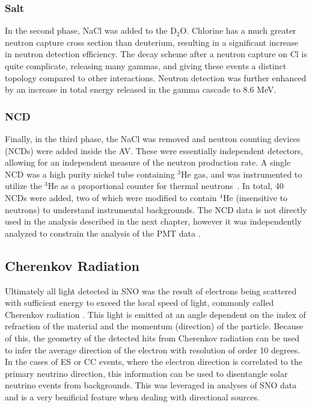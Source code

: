 \subsubsection{Salt}

In the second phase, NaCl was added to the D$_2$O.
Chlorine has a much greater neutron capture cross section than deuterium, resulting in a significant increase in neutron detection efficiency.
The decay scheme after a neutron capture on Cl is quite complicate, releasing many gammas, and giving these events a distinct topology compared to other interactions.
Neutron detection was further enhanced by an increase in total energy released in the gamma cascade to 8.6 MeV.

\subsubsection{NCD}

Finally, in the third phase, the NaCl was removed and neutron counting devices (NCDs) were added inside the AV.
These were essentially independent detectors, allowing for an independent measure of the neutron production rate.
A single NCD was a high purity nickel tube containing $^3$He gas, and was instrumented to utilize the $^3$He as a proportional counter for thermal neutrons~\cite{ncd}.
In total, 40 NCDs were added, two of which were modified to contain $^4$He (insensitive to neutrons) to understand instrumental backgrounds.
The NCD data is not directly used in the analysis described in the next chapter, however it was independently analyzed to constrain the analysis of the PMT data \cite{sno_ncd_psa,3phase}.

\subsection{Cherenkov Radiation}

Ultimately all light detected in SNO was the result of electrons being scattered with sufficient energy to exceed the local speed of light, commonly called Cherenkov radiation \cite{cherenkov}.
This light is emitted at an angle dependent on the index of refraction of the material and the momentum (direction) of the particle. 
Because of this, the geometry of the detected hits from Cherenkov radiation can be used to infer the average direction of the electron with resolution of order 10 degrees.
In the cases of ES or CC events, where the electron direction is correlated to the primary neutrino direction, this information can be used to disentangle solar neutrino events from backgrounds.
This was leveraged in analyses of SNO data and is a very benificial feature when dealing with directional sources.

